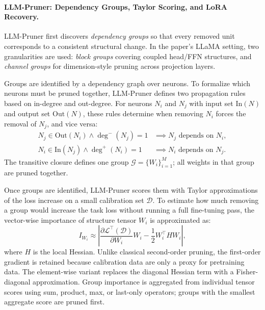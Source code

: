\paragraph{LLM-Pruner: Dependency Groups, Taylor Scoring, and LoRA Recovery.}
LLM-Pruner \cite{ma2023llmpruner} first discovers \emph{dependency groups} so that every removed unit corresponds to a consistent structural change. In the paper's LLaMA setting, two granularities are used: \emph{block groups} covering coupled head/FFN structures, and \emph{channel groups} for dimension-style pruning across projection layers.

Groups are identified by a dependency graph over neurons. To formalize which neurons must be pruned together, LLM-Pruner defines two propagation rules based on in-degree and out-degree. For neurons $N_i$ and $N_j$ with input set $\mathrm{In}(N)$ and output set $\mathrm{Out}(N)$, these rules determine when removing $N_i$ forces the removal of $N_j$, and vice versa:
\begin{align}
	N_j \in \mathrm{Out}(N_i) \wedge \deg^{-}(N_j)=1 &\implies N_j \text{ depends on } N_i, \label{eq:dep1}\\
	N_i \in \mathrm{In}(N_j) \wedge \deg^{+}(N_i)=1 &\implies N_i \text{ depends on } N_j. \label{eq:dep2}
\end{align}
The transitive closure defines one group $\mathcal{G}=\{W_i\}_{i=1}^M$; all weights in that group are pruned together.

Once groups are identified, LLM-Pruner scores them with Taylor approximations of the loss increase on a small calibration set $\mathcal{D}$. To estimate how much removing a group would increase the task loss without running a full fine-tuning pass, the vector-wise importance of structure tensor $W_i$ is approximated as:
\begin{equation}
	I_{W_i}
	\approx
	\left|
	\frac{\partial \mathcal{L}^{\top}(\mathcal{D})}{\partial W_i}W_i
	-\frac{1}{2}W_i^{\top}HW_i
	\right|,
	\label{eq:taylor-vector}
\end{equation}
where $H$ is the local Hessian. Unlike classical second-order pruning, the first-order gradient is retained because calibration data are only a proxy for pretraining data. The element-wise variant replaces the diagonal Hessian term with a Fisher-diagonal approximation. Group importance is aggregated from individual tensor scores using sum, product, max, or last-only operators; groups with the smallest aggregate score are pruned first.

